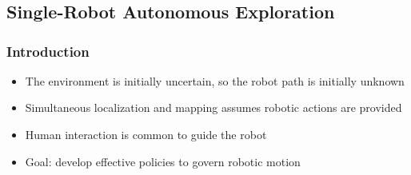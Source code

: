 \documentclass[11pt,professionalfonts,hyperref={pdftex,pdfpagemode=none,pdfstartview=FitH}]{beamer}
\begin{document}
\section*{}

\begin{frame}
\frametitle{}
{}
\end{frame}


\subsection*{Single-Robot Autonomous Exploration}

\begin{frame}
\frametitle{Introduction}
\begin{itemize}
        	\item The environment is initially uncertain, so the robot path is initially unknown
	\item Simultaneous localization and mapping assumes robotic actions are provided
	\item Human interaction is common to guide the robot
	\item Goal: develop effective policies to govern robotic motion 
\end{itemize}

\end{frame}
\end{document}
